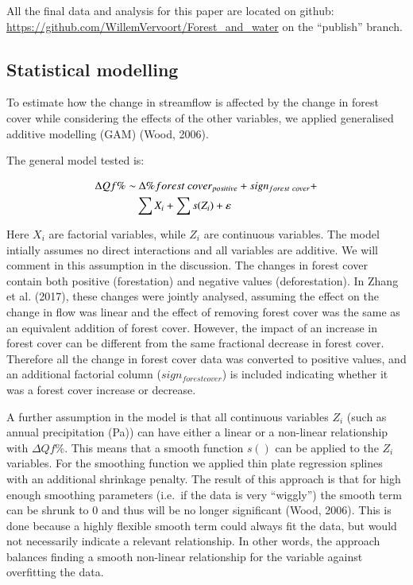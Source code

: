 \documentclass[]{elsarticle} %
\begin{document}
All the final data and analysis for this paper are located on github: \url{https://github.com/WillemVervoort/Forest_and_water} on the ``publish'' branch.

\hypertarget{statistical-modelling}{%
\subsection{Statistical modelling}\label{statistical-modelling}}

To estimate how the change in streamflow is affected by the change in forest cover while considering the effects of the other variables, we applied generalised additive modelling (GAM) (Wood, 2006).

The general model tested is:

\begin{align}
\Delta Qf \% \sim &~ \Delta \% forest~cover_{positive} + sign_{forest~cover} + \notag \\ 
& \sum{X_i} + \sum{s(Z_i)} + \varepsilon \label{eq:eq2}
\end{align}

Here \(X_i\) are factorial variables, while \(Z_i\) are continuous variables. The model intially assumes no direct interactions and all variables are additive. We will comment in this assumption in the discussion. The changes in forest cover contain both positive (forestation) and negative values (deforestation). In Zhang et al. (2017), these changes were jointly analysed, assuming the effect on the change in flow was linear and the effect of removing forest cover was the same as an equivalent addition of forest cover. However, the impact of an increase in forest cover can be different from the same fractional decrease in forest cover. Therefore all the change in forest cover data was converted to positive values, and an additional factorial column (\(sign_{forest cover}\)) is included indicating whether it was a forest cover increase or decrease.

A further assumption in the model is that all continuous variables \(Z_i\) (such as annual precipitation (Pa)) can have either a linear or a non-linear relationship with \(\Delta Qf \%\). This means that a smooth function \(s()\) can be applied to the \(Z_i\) variables. For the smoothing function we applied thin plate regression splines with an additional shrinkage penalty. The result of this approach is that for high enough smoothing parameters (i.e.~if the data is very ``wiggly'') the smooth term can be shrunk to 0 and thus will be no longer significant (Wood, 2006). This is done because a highly flexible smooth term could always fit the data, but would not necessarily indicate a relevant relationship. In other words, the approach balances finding a smooth non-linear relationship for the variable against overfitting the data.
\end{document}
